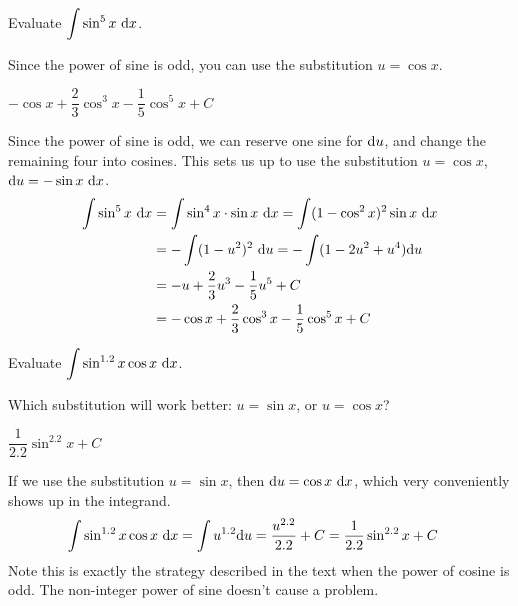 \begin{question}
Evaluate $\displaystyle\int \sin^{5}x~\mathrm{d}x$.
\end{question}
\begin{hint}
Since the power of sine is odd, you can use the substitution $u=\cos x$.
\end{hint}
\begin{answer}
$-\cos x + \dfrac{2}{3}\cos^3 x - \dfrac{1}{5}\cos^5 x +C$
\end{answer}
\begin{solution}
Since the power of sine is odd, we can reserve one sine for $\mathrm{d}u$, and change the remaining four into cosines. This sets us up to use the substitution $u=\cos x$, $\mathrm{d}u=-\sin x~\mathrm{d}x$.
\begin{align*}
\int \sin^{5}x~\mathrm{d}x&=\int \sin^4 x \cdot \sin x~\mathrm{d}x = \int (1-\cos^2 x)^2 \sin x~\mathrm{d}x
\\&=-\int (1-u^2)^2~\mathrm{d}u
= -\int (1-2u^2+u^4)\mathrm{d}u\\
&=-u+\frac{2}{3}u^3-\frac{1}{5}u^5+C\\
&=-\cos x + \frac{2}{3}\cos^3 x - \frac{1}{5}\cos^5 x +C
\end{align*}
\end{solution}



\begin{Mquestion}\label{1.8sincos2}
Evaluate $\displaystyle\int \sin^{1.2}x\cos x ~\mathrm{d}x$.
\end{Mquestion}
\begin{hint}
Which substitution will work better: $u=\sin x$, or $u=\cos x$?
\end{hint}
\begin{answer}
$\dfrac{1}{2.2}\sin^{2.2}x+C$
\end{answer}
\begin{solution}
If we use the substitution $u=\sin x$, then $\mathrm{d}u=\cos x~\mathrm{d}x$, which very conveniently shows up in the integrand.
\begin{align*}
\int \sin^{1.2}x\cos x ~\mathrm{d}x&=\int u^{1.2}\mathrm{d}u = \frac{u^{2.2}}{2.2}+C = \frac{1}{2.2}\sin^{2.2}x+C
\end{align*}
Note this is exactly the strategy described in the text when the power of cosine is odd. The non-integer power of sine doesn't cause a problem.
\end{solution}


